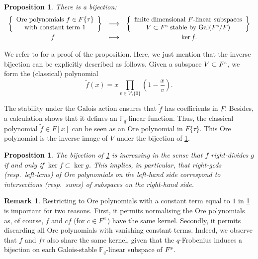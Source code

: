 \documentclass[11pt]{article}
\newtheorem{proposition}[theorem]{Proposition}
\theoremstyle{definition}
\newtheorem{remark}[theorem]{Remark}
\renewcommand{\tilde}{\widetilde}
\newcommand\Fq{\mathbb{F}_q}
\newcommand{\Fs}{F^{\text{\rm s}}}
\newcommand{\Gal}{\text{\rm Gal}}
\begin{document}
\begin{proposition}
\label{prop:Orebijection}
There is a bijection:
$$\begin{array}{rcl}
\left\{ \begin{array}{c}
  \text{\rm Ore polynomials } f \in F\{\tau\}\\
  \text{\rm with constant term } 1
\end{array}\right\} &
\longrightarrow & 
\left\{ \begin{array}{c}
  \text{\rm finite dimensional $F$-linear subspaces} \\
  V \subset \Fs \text{\rm ~stable by } \Gal(\Fs/F)
\end{array}\right\} \smallskip \\
f\phantom{replace au centre} & \longmapsto & \phantom{on replace au centre}\ker f.
\end{array}$$
\end{proposition}

We refer to \cite[\S~1.2]{G98} for a proof of the proposition.
Here, we just mention that the inverse bijection can be explicitly
described as follows. Given a subspace $V \subset \Fs$, we form the
(classical) polynomial
$$\tilde f(x) = x \prod_{v \in V\setminus\{0\}} \left(1 - \frac x v\right).$$

The stability under the Galois action ensures that $\tilde f$ has
coefficients in $F$. Besides, a calculation shows that it defines
an $\Fq$-linear function.
Thus, the classical polynomial $\tilde f \in F[x]$ can be seen as an Ore
polynomial in $F\{\tau\}$. This Ore polynomial is the inverse image of $V$
under the bijection of \cref{prop:Orebijection}.
\begin{proposition}
\label{rem:Orebijection}
The bijection of \cref{prop:Orebijection} is increasing
in the sense that $f$ right-divides $g$ if and only if $\ker f \subset \ker g$. This implies, in particular, that right-gcds (resp.~left-lcms) of
Ore polynomials on the left-hand side correspond to intersections
(resp.~sums) of subspaces on the right-hand side.
\end{proposition}

\begin{remark}
Restricting to Ore polynomials with a constant term equal to $1$ in
\cref{prop:Orebijection} is important for two reasons.
First, it permits normalising the Ore polynomials as, of course,
$f$ and $cf$ (for $c \in F^\times$) have the same kernel. Secondly, it permits discarding all Ore polynomials with vanishing constant
terms. Indeed, we observe that $f$ and $f\tau$ also share the same kernel, given that the $q$-Frobenius induces a bijection on each Galois-stable $\Fq$-linear subspace of $\Fs$.
\end{remark}
\end{document}
